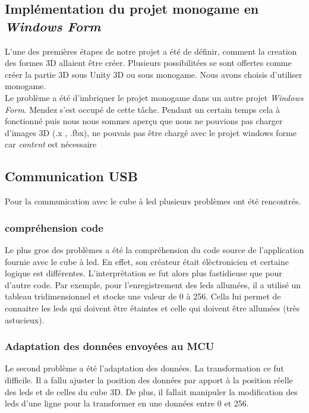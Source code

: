 \documentclass[a4paper,12pt]{article}
\begin{document}
\subsection{Implémentation du projet monogame en \textit{Windows Form}}

L'une des premières étapes de notre projet a été de définir, comment la creation des formes 3D allaient être créer. Plusieurs possibilitées se sont offertes comme créer la partie 3D sous Unity 3D ou sous monogame. Nous avons choisis d'utiliser monogame. \\

Le problème a été d'imbriquer le projet monogame dans un autre projet \textit{Windows Form}. Mendez s'est occupé de cette tâche. Pendant un certain temps cela à fonctionné puis nous nous sommes aperçu que nous ne pouvions pas charger d'images 3D (.x , .fbx), ne pouvais pas être chargé avec le projet windows forme car \textit{content} est nécessaire

\subsection{Communication USB}
Pour la communication avec le cube à led plusieurs problèmes ont été rencontrés.

\subsubsection{compréhension code}
Le plus gros des problèmes a été la compréhension du code source de l'application fournie avec le cube à led. En effet, son créateur était élèctronicien et certaine logique est différentes. L'interprètation se fut alors plus fastidieuse que pour d'autre code. Par exemple, pour l'enregistrement des leds allumées, il a utilisé un tableau tridimensionnel et stocke une valeur de 0 à 256. Cella lui permet de connaitre les leds qui doivent être étaintes et celle qui doivent être allumées (très astucieux).

\subsubsection{Adaptation des données envoyées au MCU}
Le second problème a été l'adaptation des données. La transformation ce fut difficile. Il a fallu ajuster la position des données par apport à la position réelle des leds et de celles du cube 3D. De plus, il fallait manipuler la modification des leds d'une ligne pour la transformer en une données entre 0 et 256.
\end{document}

